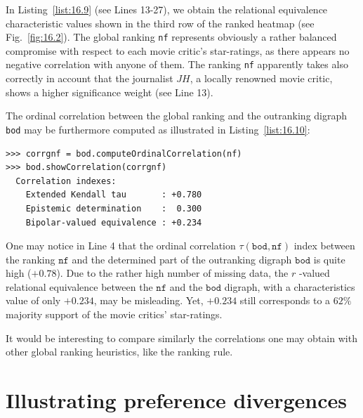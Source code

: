 In Listing~\vref{list:16.9} (see Lines 13-27), we obtain the relational equivalence characteristic values shown in the third row of the ranked heatmap (see Fig.~\vref{fig:16.2}). The global \NetFlows ranking \texttt{nf} represents obviously a rather balanced compromise with respect to each movie critic's star-ratings, as there appears no negative correlation with anyone of them. The ranking \texttt{nf} apparently takes also correctly in account that the journalist $JH$, a locally renowned movie critic, shows a higher significance weight (see Line 13).

The ordinal correlation between the global \NetFlows ranking and the outranking digraph \texttt{bod} may be furthermore computed as illustrated in Listing~\vref{list:16.10}: 
\begin{lstlisting}[caption={Computing the ordinal correlation between \NetFlows and global outranking digraph},label=list:16.10]
>>> corrgnf = bod.computeOrdinalCorrelation(nf)
>>> bod.showCorrelation(corrgnf)
  Correlation indexes:
    Extended Kendall tau       : +0.780
    Epistemic determination    :  0.300
    Bipolar-valued equivalence : +0.234
\end{lstlisting}

One may notice in Line 4 that the ordinal correlation $\tau(\mathtt{bod},\mathtt{nf})$ index between the \NetFlows ranking $\mathtt{nf}$ and the determined part of the outranking digraph $\mathtt{bod}$ is quite high ($+0.78$). Due to the rather high number of missing data, the $r$ -valued relational equivalence between the $\mathtt{nf}$ and the $\mathtt{bod}$ digraph, with a characteristics value of only $+0.234$, may be misleading. Yet, $+0.234$ still corresponds to a $62\%$ majority support of the movie critics' star-ratings.

It would be interesting to compare similarly the correlations one may obtain with other global ranking heuristics, like the \Copeland ranking rule.

\section{Illustrating preference divergences}
\label{sec:16.4}

